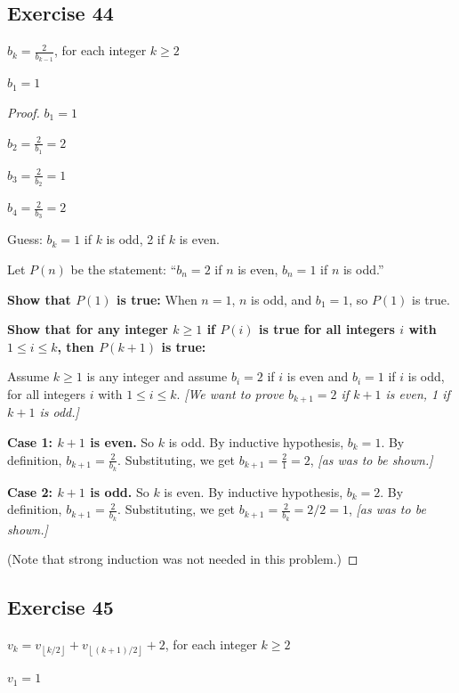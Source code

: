 \documentclass[14pt]{extarticle}
\newcommand{\dps}{\displaystyle}
\newcommand{\floor}[1]{{\left\lfloor#1\right\rfloor}}
\begin{document}
\subsection{Exercise 44}
\(b_k = \dps \frac{2}{b_{k-1}}\), for each integer \(k \geq 2\)

\(b_1 = 1\)

\begin{proof}
\(b_1 = 1\)

\(b_2 = \dps\frac{2}{b_1} = 2\)

\(b_3 = \dps\frac{2}{b_2} = 1\)

\(b_4 = \dps\frac{2}{b_3} = 2\)

Guess: \(b_k = 1\) if $k$ is odd, 2 if $k$ is even.

Let $P(n)$ be the statement: ``\(b_n = 2\) if $n$ is even, \(b_n = 1\) if $n$ is odd.''

{\bf Show that $P(1)$ is true:} When $n = 1$, $n$ is odd, and $b_1 = 1$, so $P(1)$ is true.

{\bf Show that for any integer \(k \geq 1\) if $P(i)$ is true for all integers $i$ with \(1 \leq i \leq k\), then
$P(k+1)$ is true:}

Assume \(k \geq 1\) is any integer and assume \(b_i = 2\) if $i$ is even and \(b_i = 1\) if $i$ is odd,
for all integers $i$ with \(1 \leq i \leq k\). {\it [We want to prove \(b_{k+1} = 2\) if $k+1$ is even, 1 if 
$k+1$ is odd.]}

{\bf Case 1: $k+1$ is even.} So $k$ is odd. By inductive hypothesis, \(b_k = 1\).
By definition, \(b_{k+1} = \dps \frac{2}{b_k}\).
Substituting, we get \(b_{k+1} = \dps \frac{2}{1} = 2\), {\it [as was to be shown.]}

{\bf Case 2: $k+1$ is odd.} So $k$ is even. By inductive hypothesis, \(b_k = 2\).
By definition, \(b_{k+1} = \dps \frac{2}{b_k}\).
Substituting, we get \(b_{k+1} = \dps \frac{2}{b_k} = 2/2 = 1\), {\it [as was to be shown.]}

(Note that strong induction was not needed in this problem.)
\end{proof}

\subsection{Exercise 45}
\(\dps v_k = v_{\floor{k/2}} + v_{\floor{(k+1)/2}} + 2\), for each integer \(k \geq 2\)

\(v_1 = 1\)
\end{document}

